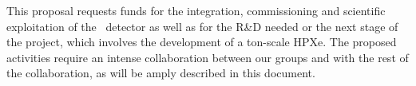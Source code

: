 
 
 This proposal requests funds for the integration, commissioning and scientific exploitation of the \Next\ detector as well as for the R\&D needed or the next stage of the project, 
 which involves the development of a ton-scale HPXe. The proposed activities require an intense collaboration between our groups and with the rest of the collaboration, as will be amply described in this document. 
 
 
 
